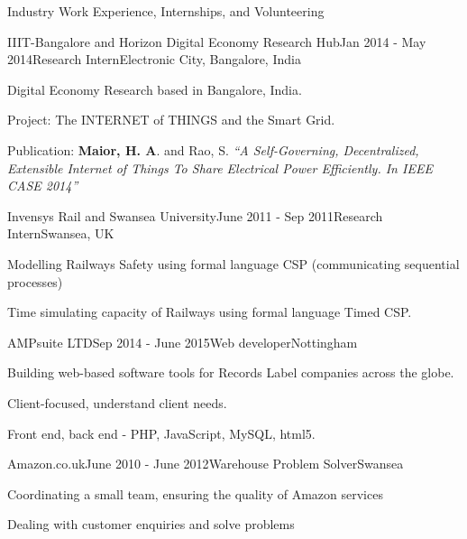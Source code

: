 \documentclass{resume} %
\begin{document}
\begin{rSection}{Industry Work Experience, Internships, and Volunteering}
	\begin{rSubsection}{IIIT-Bangalore and Horizon Digital Economy Research Hub}{Jan 2014 - May 2014}{Research Intern}{Electronic City, Bangalore, India}
		\item Digital Economy Research based in Bangalore, India.
		\item Project: The INTERNET of THINGS and the Smart Grid.
		\item Publication: \textbf{Maior, H. A}. and Rao, S.  \emph{``A Self-Governing, Decentralized, Extensible Internet of Things To Share Electrical Power Efficiently. In IEEE CASE 2014''}
	\end{rSubsection}
	\begin{rSubsection}{Invensys Rail and Swansea University}{June 2011 - Sep 2011}{Research Intern}{Swansea, UK}
		\item Modelling Railways Safety using formal language CSP (communicating sequential processes)
		\item Time simulating capacity of Railways using formal language Timed CSP.
	\end{rSubsection}


  \begin{rSubsection}{AMPsuite LTD}{Sep 2014 - June 2015}{Web developer}{Nottingham}
        \item Building web-based software tools for Records Label companies across the globe.
        \item Client-focused, understand client needs.
        \item Front end, back end - PHP, JavaScript, MySQL, html5.
    \end{rSubsection}
    \begin{rSubsection}{Amazon.co.uk}{June 2010 - June 2012}{Warehouse Problem Solver}{Swansea}
        \item  Coordinating a small team, ensuring the quality of Amazon services 
        \item  Dealing with customer enquiries and solve problems
	\end{rSubsection}

\end{rSection}
\end{document}
